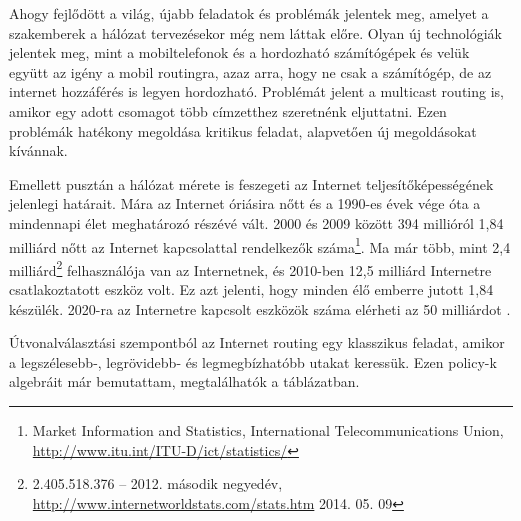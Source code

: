  Ahogy fejlődött a világ, újabb feladatok és problémák jelentek meg, amelyet a szakemberek a hálózat tervezésekor még nem láttak előre. Olyan új technológiák jelentek meg, mint a mobiltelefonok és a hordozható számítógépek és velük együtt az igény a mobil routingra, azaz arra, hogy ne csak a számítógép, de az internet hozzáférés is legyen hordozható. Problémát jelent a multicast routing is, amikor egy adott csomagot több címzetthez szeretnénk eljuttatni. Ezen problémák hatékony megoldása kritikus feladat, alapvetően új megoldásokat kívánnak.

  Emellett pusztán a hálózat mérete is feszegeti az Internet teljesítőképességének jelenlegi határait. Mára az Internet óriásira nőtt és a 1990-es évek vége óta a mindennapi élet meghatározó részévé vált. 2000 és 2009 között 394 millióról 1,84 milliárd nőtt az Internet kapcsolattal rendelkezők száma\footnote{Market Information and Statistics, International Telecommunications Union, \url{http://www.itu.int/ITU-D/ict/statistics/}}. Ma már több, mint 2,4 milliárd\footnote{2.405.518.376 -- 2012. második negyedév, \url{http://www.internetworldstats.com/stats.htm} 2014. 05. 09} felhasználója van az Internetnek, és 2010-ben 12,5 milliárd Internetre csatlakoztatott eszköz volt. Ez azt jelenti, hogy minden élő emberre jutott 1,84 készülék. 2020-ra az Internetre kapcsolt eszközök száma elérheti az 50 milliárdot \cite{The_Internet_of_Things}.\newpage

  Útvonalválasztási szempontból az Internet routing egy klasszikus feladat, amikor a legszélesebb-, legrövidebb- és legmegbízhatóbb utakat keressük. Ezen policy-k algebráit már bemutattam, megtalálhatók a  táblázatban.

